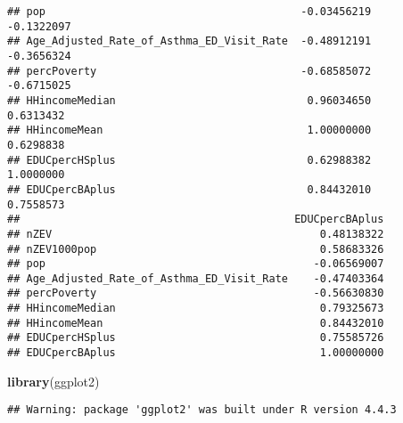 \documentclass[
]{article}
\newenvironment{Shaded}{\begin{snugshade}}{\end{snugshade}}
\newcommand{\AttributeTok}[1]{\textcolor[rgb]{0.13,0.29,0.53}{#1}}
\newcommand{\CommentTok}[1]{\textcolor[rgb]{0.56,0.35,0.01}{\textit{#1}}}
\newcommand{\DecValTok}[1]{\textcolor[rgb]{0.00,0.00,0.81}{#1}}
\newcommand{\FunctionTok}[1]{\textcolor[rgb]{0.13,0.29,0.53}{\textbf{#1}}}
\newcommand{\NormalTok}[1]{#1}
\newcommand{\OtherTok}[1]{\textcolor[rgb]{0.56,0.35,0.01}{#1}}
\newcommand{\SpecialCharTok}[1]{\textcolor[rgb]{0.81,0.36,0.00}{\textbf{#1}}}
\newcommand{\StringTok}[1]{\textcolor[rgb]{0.31,0.60,0.02}{#1}}
\begin{document}
\begin{verbatim}
## pop                                        -0.03456219     -0.1322097
## Age_Adjusted_Rate_of_Asthma_ED_Visit_Rate  -0.48912191     -0.3656324
## percPoverty                                -0.68585072     -0.6715025
## HHincomeMedian                              0.96034650      0.6313432
## HHincomeMean                                1.00000000      0.6298838
## EDUCpercHSplus                              0.62988382      1.0000000
## EDUCpercBAplus                              0.84432010      0.7558573
##                                           EDUCpercBAplus
## nZEV                                          0.48138322
## nZEV1000pop                                   0.58683326
## pop                                          -0.06569007
## Age_Adjusted_Rate_of_Asthma_ED_Visit_Rate    -0.47403364
## percPoverty                                  -0.56630830
## HHincomeMedian                                0.79325673
## HHincomeMean                                  0.84432010
## EDUCpercHSplus                                0.75585726
## EDUCpercBAplus                                1.00000000
\end{verbatim}

\begin{Shaded}
\begin{Highlighting}[]
\FunctionTok{library}\NormalTok{(ggplot2)}
\end{Highlighting}
\end{Shaded}

\begin{verbatim}
## Warning: package 'ggplot2' was built under R version 4.4.3
\end{verbatim}

\begin{Shaded}
\end{Shaded}
\end{document}

